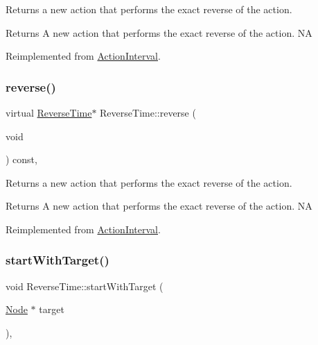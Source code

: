 Returns a new action that performs the exact reverse of the action.

\begin{DoxyReturn}{Returns}
A new action that performs the exact reverse of the action.  NA 
\end{DoxyReturn}


Reimplemented from \hyperlink{classActionInterval_a9f9ac7164036a0bc261a72f62a2b2da7}{Action\+Interval}.

\mbox{\label{classReverseTime_af793780e6f99198c1ae1dff33a8b0d25}} 
\subsubsection{\texorpdfstring{reverse()}{reverse()}\hspace{0.1cm}{\footnotesize\ttfamily [2/2]}}
{\footnotesize\ttfamily virtual \hyperlink{classReverseTime}{Reverse\+Time}$\ast$ Reverse\+Time\+::reverse (\begin{DoxyParamCaption}\item[{void}]{ }\end{DoxyParamCaption}) const\hspace{0.3cm}{\ttfamily [override]}, {\ttfamily [virtual]}}

Returns a new action that performs the exact reverse of the action.

\begin{DoxyReturn}{Returns}
A new action that performs the exact reverse of the action.  NA 
\end{DoxyReturn}


Reimplemented from \hyperlink{classActionInterval_a9f9ac7164036a0bc261a72f62a2b2da7}{Action\+Interval}.

\mbox{\label{classReverseTime_a5872b14aa6f27a0f76bc5542da183b53}} 
\subsubsection{\texorpdfstring{start\+With\+Target()}{startWithTarget()}\hspace{0.1cm}{\footnotesize\ttfamily [1/2]}}
{\footnotesize\ttfamily void Reverse\+Time\+::start\+With\+Target (\begin{DoxyParamCaption}\item[{\hyperlink{classNode}{Node} $\ast$}]{target }\end{DoxyParamCaption})\hspace{0.3cm}{\ttfamily [override]}, {\ttfamily [virtual]}}

